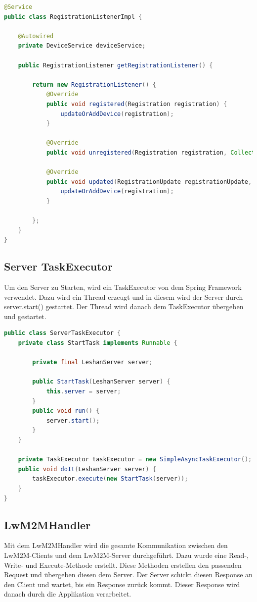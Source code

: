 \begin{lstlisting}[language=java]
@Service
public class RegistrationListenerImpl {

	@Autowired
	private DeviceService deviceService;

	public RegistrationListener getRegistrationListener() {

		return new RegistrationListener() {
			@Override
			public void registered(Registration registration) {
				updateOrAddDevice(registration);
			}

			@Override
			public void unregistered(Registration registration, Collection<Observation> observerColl) {}

			@Override
			public void updated(RegistrationUpdate registrationUpdate, Registration registration) {
				updateOrAddDevice(registration);
			}

		};
	}
}
\end{lstlisting}
\newpage

\subsection{Server TaskExecutor}
Um den Server zu Starten, wird ein TaskExecutor von dem Spring Framework verwendet. Dazu wird ein Thread erzeugt und in diesem wird der Server durch server.start() gestartet. Der Thread wird danach dem TaskExecutor übergeben und gestartet.
\begin{lstlisting}[language=java]
public class ServerTaskExecutor {
	private class StartTask implements Runnable {

		private final LeshanServer server;

		public StartTask(LeshanServer server) {
			this.server = server;
		}
		public void run() {
			server.start();
		}
	}

	private TaskExecutor taskExecutor = new SimpleAsyncTaskExecutor();
	public void doIt(LeshanServer server) {
		taskExecutor.execute(new StartTask(server));
	}
}
\end{lstlisting}
\newpage

\subsection{LwM2MHandler}
Mit dem LwM2MHandler wird die gesamte Kommunikation zwischen den LwM2M-Clients und dem LwM2M-Server durchgeführt. Dazu wurde eine Read-, Write- und Execute-Methode  erstellt. Diese Methoden erstellen den passenden Request und übergeben diesen dem Server. Der Server schickt diesen Response an den Client und wartet, bis ein Response zurück kommt. Dieser Response wird danach durch die Applikation verarbeitet. 

